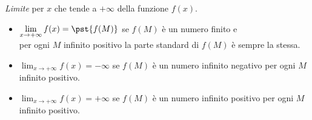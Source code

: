 \begin{definizione}
\emph{Limite} per \(x\) che tende a \(+\infty\) della funzione \(f(x)\).
\begin{itemize}
\item 
\(\displaystyle \lim_{x \to +\infty}f(x) = \pst{f(M)}\)
se \(f(M)\) è un numero finito e \\
per ogni \(M\) infinito positivo
la parte standard di \(f(M)\) è sempre la stessa.
\item 
\(\displaystyle \lim_{x \to +\infty}f(x) = -\infty\)
se \(f(M)\) è un numero infinito negativo 
per ogni \(M\) infinito positivo.
\item 
\(\displaystyle \lim_{x \to +\infty}f(x) = +\infty\)
se \(f(M)\) è un numero infinito positivo 
per ogni \(M\) infinito positivo.
\end{itemize}
\end{definizione}

